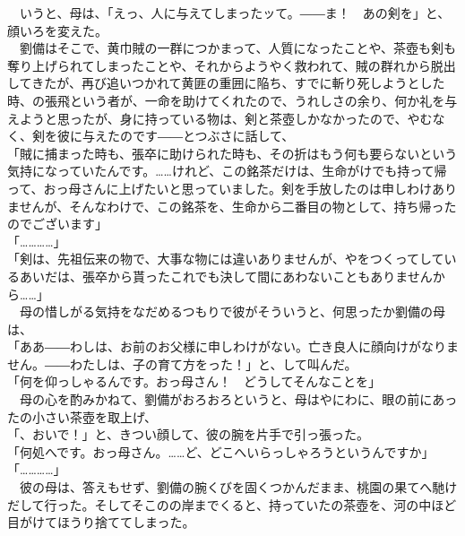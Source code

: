 \documentclass[
  paper=a5,
  fontsize=10pt,
  jafontsize=9.5pt,
  tate,                  %
  open_bracket_pos=nibu, %
]{jlreq}
\begin{document}
　いうと、母は、「えっ、人に与えてしまったッて。――ま！　あの剣を」と、顔いろを変えた。\\


　劉備はそこで、黄巾賊の一群につかまって、人質になったことや、茶壺も剣も奪り上げられてしまったことや、それからようやく救われて、賊の群れから脱出してきたが、再び追いつかれて黄匪の重囲に陥ち、すでに斬り死しようとした時、の張飛という者が、一命を助けてくれたので、うれしさの余り、何か礼を与えようと思ったが、身に持っている物は、剣と茶壺しかなかったので、やむなく、剣を彼に与えたのです――とつぶさに話して、\\


「賊に捕まった時も、張卒に助けられた時も、その折はもう何も要らないという気持になっていたんです。……けれど、この銘茶だけは、生命がけでも持って帰って、おっ母さんに上げたいと思っていました。剣を手放したのは申しわけありませんが、そんなわけで、この銘茶を、生命から二番目の物として、持ち帰ったのでございます」\\


「…………」\\


「剣は、先祖伝来の物で、大事な物には違いありませんが、やをつくってしているあいだは、張卒から貰ったこれでも決して間にあわないこともありませんから……」\\


　母の惜しがる気持をなだめるつもりで彼がそういうと、何思ったか劉備の母は、\\


「ああ――わしは、お前のお父様に申しわけがない。亡き良人に顔向けがなりません。――わたしは、子の育て方をった！」と、して叫んだ。\\


「何を仰っしゃるんです。おっ母さん！　どうしてそんなことを」\\


　母の心を酌みかねて、劉備がおろおろというと、母はやにわに、眼の前にあったの小さい茶壺を取上げ、\\


「、おいで！」と、きつい顔して、彼の腕を片手で引っ張った。\\


「何処へです。おっ母さん。……ど、どこへいらっしゃろうというんですか」\\


「…………」\\


　彼の母は、答えもせず、劉備の腕くびを固くつかんだまま、桃園の果てへ馳けだして行った。そしてそこのの岸までくると、持っていたの茶壺を、河の中ほど目がけてほうり捨ててしまった。\\
\end{document}
